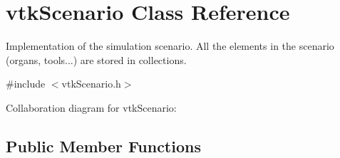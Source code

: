 \hypertarget{classvtkScenario}{
\section{vtkScenario Class Reference}
\label{classvtkScenario}
}


Implementation of the simulation scenario. All the elements in the scenario (organs, tools...) are stored in collections.  




{\ttfamily \#include $<$vtkScenario.h$>$}



Collaboration diagram for vtkScenario:\subsection*{Public Member Functions}
